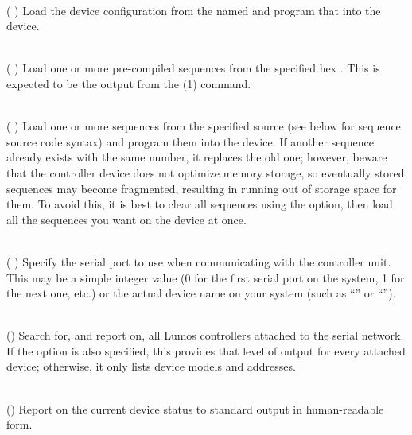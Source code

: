 \begin{list}{}{}
\item[{\codetype{----load--configuration=}\Var*{file}}]\hfill\\
(
)
Load the device configuration from the named
and program that into the device.
\item[{\codetype{----load--hex--sequence=}\Var*{file}}]\hfill\\
(
)
Load one or more pre-compiled sequences from the specified hex 
.
This is expected to be the output from the 
(1)
command.
\item[{\codetype{----load--sequence=}\Var*{file}}]\hfill\\
(
)
Load one or more sequences from the specified source
(see below for sequence source code syntax) and program them
into the device.  If another sequence already exists with the
same number, it replaces the old one; however, beware that the
controller device does not optimize memory storage, so eventually
stored sequences may become fragmented, resulting in running out of
storage space for them.  To avoid this, it is best to clear all
sequences using the
option, then load all the sequences you want on the device at once.
\item[{\codetype{----port=}\Var*{port}}]\hfill\\
(
)
Specify the serial port to use when communicating with the controller
unit.  This may be a simple integer value (0 for the first serial port
on the system, 1 for the next one, etc.) or the actual device name
on your system (such as 
``''
or
``'').
\item[{\codetype{----probe}}]\hfill\\
()
Search for, and report on, all Lumos controllers attached to the serial network.
If the
option is also specified, this provides that level of output for every attached
device; otherwise, it only lists device models and addresses.
\item[{\codetype{----report}}]\hfill\\
()
Report on the current device status to standard output in human-readable form.
\item[{\codetype{----sensor=}\Var*{s}\codetype{\textnormal{[}orw+\textnormal{]}:}\Var*{init}\codetype{:}\Var*{seq}\codetype{:}\Var*{term}}]\hfill\\

\end{list}
